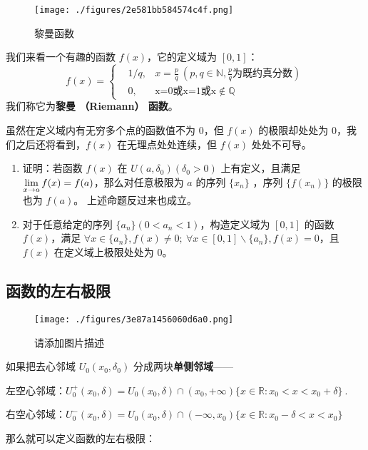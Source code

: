 \begin{figure}[ht]
\centering
\texttt{[image: ./figures/2e581bb584574c4f.png]}
\caption{黎曼函数} \label{fig_limfx_2}
\end{figure}

我们来看一个有趣的函数 $f(x)$，它的定义域为 $[0,1]$：
\begin{equation}
f(x)=\left\{
\begin{aligned} 
&1/q, &x=\frac{p}{q}\ (p,q\in \mathbb{N},\frac{p}{q}\text{为既约真分数})\\
&0,&\text{x=0或x=1或x}\notin \mathbb{Q}
\end{aligned}
\right.
\end{equation}
我们称它为\textbf{黎曼 （Riemann） 函数}。

虽然在定义域内有无穷多个点的函数值不为 $0$，但 $f(x)$ 的极限却处处为 $0$，我们之后还将看到，$f(x)$ 在无理点处处连续，但 $f(x)$ 处处不可导。

\begin{exercise}{}
\begin{enumerate}
\item 证明：若函数 $f(x)$ 在 $U(a,\delta_0)(\delta_0>0)$ 上有定义，且满足 $\large\lim\limits_{x\rightarrow a}f(x)=f(a)$，那么对任意极限为 $a$ 的序列 $\{x_n\}$ ，序列 $\{f(x_n)\}$ 的极限也为 $f(a)$。
     上述命题反过来也成立。
\item 对于任意给定的序列 $\{a_n\}(0<a_n<1)$，构造定义域为 $[0,1]$ 的函数 $f(x)$，满足 $\forall x\in \{a_n\},f(x)\neq 0;\ \forall x \in [0,1]\backslash \{a_n\},f(x)=0$，且 $f(x)$ 在定义域上极限处处为 $0$。
\end{enumerate}
\end{exercise}
\subsection{函数的左右极限}
\begin{figure}[ht]
\centering
\texttt{[image: ./figures/3e87a1456060d6a0.png]}
\caption{请添加图片描述} \label{fig_limfx_3}
\end{figure}
  如果把去心邻域 $U_0(x_0,\delta_0)$ 分成两块\textbf{单侧邻域}——

  左空心邻域：$U_0^+(x_0,\delta)=U_0(x_0,\delta)\cap (x_0,+\infty) \{x\in \mathbb{R} :x_0< x<x_0+\delta\}~.$

  右空心邻域：$U_0^-(x_0,\delta)=U_0(x_0,\delta)\cap (-\infty,x_0) \{x\in \mathbb{R} :x_0-\delta< x<x_0\}$

  那么就可以定义函数的左右极限：


